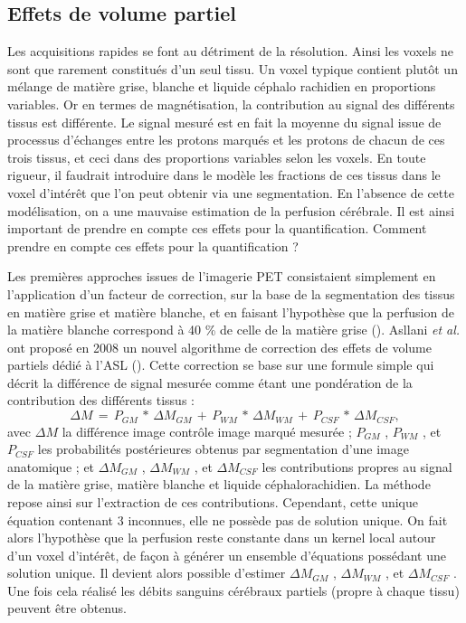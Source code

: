 \subsection{Effets de volume partiel}
\label{sec:volpar}
Les acquisitions rapides se font au détriment de la résolution. Ainsi les voxels ne sont que
rarement constitués d’un seul tissu. Un voxel typique contient plutôt un mélange de matière grise,
blanche et liquide céphalo rachidien en proportions variables. Or en termes de magnétisation, la
contribution au signal des différents tissus est différente. Le signal mesuré est en fait la moyenne du
signal issue de processus d’échanges entre les protons marqués et les protons de chacun de ces trois
tissus, et ceci dans des proportions variables selon les voxels. En toute rigueur, il faudrait introduire
dans le modèle les fractions de ces tissus dans le voxel d’intérêt que l’on peut obtenir via une segmentation. En l’absence de cette modélisation, on a une mauvaise estimation de la perfusion
cérébrale. Il est ainsi important de prendre en compte ces effets pour la quantification. Comment
prendre en compte ces effets pour la quantification ?

Les premières approches issues de l’imagerie PET consistaient simplement en l’application
d’un facteur de correction, sur la base de la segmentation des tissus en matière grise et matière
blanche, et en faisant l’hypothèse que la perfusion de la matière blanche correspond à 40 \% de celle
de la matière grise (\cite{Kim2012}). Asllani {\em et al.} ont proposé en 2008 un nouvel algorithme de correction des
effets de volume partiels dédié à l’ASL (\cite{Asllani2008}). Cette correction se base sur une formule simple qui décrit
la différence de signal mesurée comme étant une pondération de la contribution des différents tissus :
\begin{equation}
\label{eq:asllani}
\Delta M\,=\,P_{GM}\,\ast\,\Delta M_{GM}\,+\,P_{WM}\,\ast\,\Delta M_{WM}\,+\,P_{CSF}\,\ast\,\Delta M_{CSF},
\end{equation}
avec $\Delta M$ la différence image contrôle image marqué mesurée ; $P_{GM}$ , $P_{WM}$ , et $P_{CSF}$ les probabilités
postérieures obtenus par segmentation d’une image anatomique ; et $\Delta M_{GM}$ , $\Delta M_{WM}$  , et $\Delta M_{CSF}$  les
contributions propres au signal de la matière grise, matière blanche et liquide céphalorachidien. La
méthode repose ainsi sur l’extraction de ces contributions. Cependant, cette unique équation
contenant 3 inconnues, elle ne possède pas de solution unique. On fait alors l’hypothèse que la
perfusion reste constante dans un kernel local autour d’un voxel d’intérêt, de façon à générer un
ensemble d’équations possédant une solution unique. Il devient alors possible d’estimer $\Delta M_{GM}$ , $\Delta M_{WM}$  , et $\Delta M_{CSF}$ . Une fois cela réalisé les débits sanguins cérébraux partiels (propre à chaque tissu)
peuvent être obtenus.

